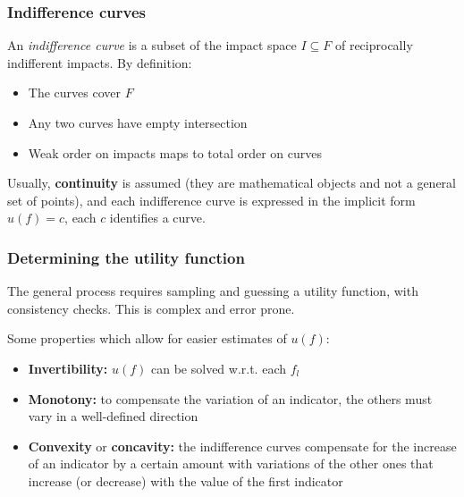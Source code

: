 \subsubsection{Indifference curves}

An \textit{indifference curve} is a subset of the impact space $I \subseteq F$ of reciprocally indifferent impacts. By definition: 
\begin{itemize}
	\item The curves cover $F$
	
	\item Any two curves have empty intersection
	
	\item Weak order on impacts maps to total order on curves
\end{itemize}

Usually, \textbf{continuity} is assumed (they are mathematical objects and not a general set of points), and each indifference curve is expressed in the implicit form $ u(f) = c$, each $c$ identifies a curve.


\subsubsection{Determining the utility function}

The general process requires sampling and guessing a utility function, with consistency checks. This is complex and error prone. 

Some properties which allow for easier estimates of $u(f)$: 
\begin{itemize}
	\item \textbf{Invertibility:} $u(f)$ can be solved w.r.t. each $f_l$
	
	\item \textbf{Monotony:} to compensate the variation of an indicator, the others must vary in a well-defined direction
	
	\item \textbf{Convexity} or \textbf{concavity:} the indifference curves compensate for the increase 	of an indicator by a certain amount with variations of the other ones that increase (or decrease) with the value of the first indicator
\end{itemize}

